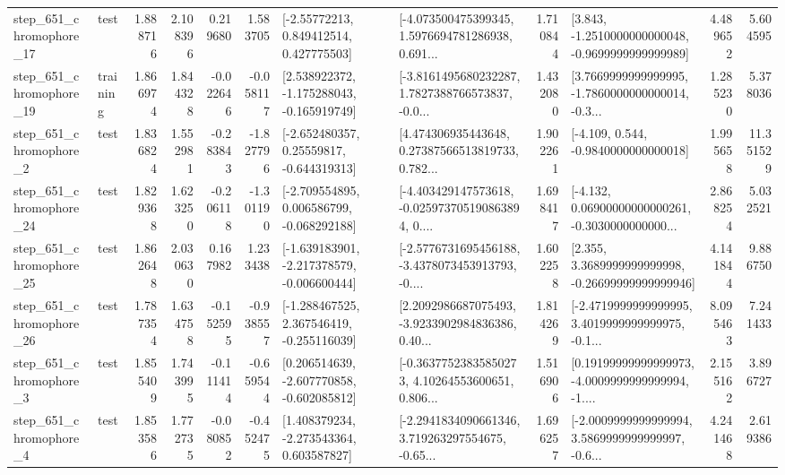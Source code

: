 \begin{tabular}{llrrrrllrlrr}
  step\_651\_chromophore\_17 &      test &      1.888716 &    2.108396 &      0.219680 &  1.583705 &     [-2.55772213, 0.849412514, 0.427775503] &  [-4.073500475399345, 1.5976694781286938, 0.691... &       1.710844 &  [3.843, -1.2510000000000048, -0.9699999999999989] &            4.489652 &          5.604595 \\
  step\_651\_chromophore\_19 &  training &      1.866974 &    1.844328 &     -0.022646 & -0.058117 &   [2.538922372, -1.175288043, -0.165919749] &  [-3.8161495680232287, 1.7827388766573837, -0.0... &       1.432080 &  [3.7669999999999995, -1.7860000000000014, -0.3... &            1.285230 &          5.378036 \\
   step\_651\_chromophore\_2 &      test &      1.836824 &    1.552981 &     -0.283843 & -1.827796 &    [-2.652480357, 0.25559817, -0.644319313] &  [4.474306935443648, 0.27387566513819733, 0.782... &       1.902261 &               [-4.109, 0.544, -0.9840000000000018] &            1.995658 &         11.351529 \\
  step\_651\_chromophore\_24 &      test &      1.829368 &    1.623250 &     -0.206118 & -1.301190 &   [-2.709554895, 0.006586799, -0.068292188] &  [-4.403429147573618, -0.025973705190863894, 0.... &       1.698417 &  [-4.132, 0.06900000000000261, -0.3030000000000... &            2.868254 &          5.032521 \\
  step\_651\_chromophore\_25 &      test &      1.862648 &    2.030630 &      0.167982 &  1.233438 &  [-1.639183901, -2.217378579, -0.006600444] &  [-2.5776731695456188, -3.4378073453913793, -0.... &       1.602258 &  [2.355, 3.3689999999999998, -0.26699999999999946] &            4.141844 &          9.886750 \\
  step\_651\_chromophore\_26 &      test &      1.787354 &    1.634758 &     -0.152595 & -0.938557 &   [-1.288467525, 2.367546419, -0.255116039] &  [2.2092986687075493, -3.9233902984836386, 0.40... &       1.814269 &  [-2.4719999999999995, 3.4019999999999975, -0.1... &            8.095463 &          7.241433 \\
   step\_651\_chromophore\_3 &      test &      1.855409 &    1.743995 &     -0.111414 & -0.659544 &   [0.206514639, -2.607770858, -0.602085812] &  [-0.36377523835850273, 4.10264553600651, 0.806... &       1.516906 &  [0.19199999999999973, -4.0009999999999994, -1.... &            2.155162 &          3.896727 \\
   step\_651\_chromophore\_4 &      test &      1.853586 &    1.772735 &     -0.080852 & -0.452475 &    [1.408379234, -2.273543364, 0.603587827] &  [-2.2941834090661346, 3.719263297554675, -0.65... &       1.696257 &  [-2.0009999999999994, 3.5869999999999997, -0.6... &            4.241468 &          2.619386 \\

\end{tabular}
